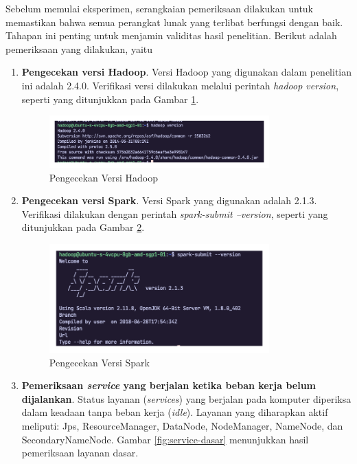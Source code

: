 Sebelum memulai eksperimen, serangkaian pemeriksaan dilakukan untuk memastikan bahwa semua perangkat lunak yang terlibat berfungsi dengan baik. Tahapan ini penting untuk menjamin validitas hasil penelitian. Berikut adalah pemeriksaan yang dilakukan, yaitu
\begin{enumerate}
	\item \textbf{Pengecekan versi Hadoop}. Versi Hadoop yang digunakan dalam penelitian ini adalah 2.4.0. Verifikasi versi dilakukan melalui perintah \textit{hadoop version}, seperti yang ditunjukkan pada Gambar \ref{fig:versi-hadoop}. 
		\begin{figure}[h]
		    \centering
		    \includegraphics[width=0.8\textwidth]{figures/ch04/versi-hadoop}
		    \caption{Pengecekan Versi Hadoop}
		    \label{fig:versi-hadoop}
		\end{figure}
	\item \textbf{Pengecekan versi Spark}. Versi Spark yang digunakan adalah 2.1.3. Verifikasi dilakukan dengan perintah \textit{spark-submit --version}, seperti yang ditunjukkan pada Gambar \ref{fig:versi-spark}.
		\begin{figure}[h]
		    \centering
		    \includegraphics[width=0.8\textwidth]{figures/ch04/versi-spark}
		    \caption{Pengecekan Versi Spark}
		    \label{fig:versi-spark}
		\end{figure}
	\item \textbf{Pemeriksaan \textit{service} yang berjalan ketika beban kerja belum dijalankan}. Status layanan (\textit{services}) yang berjalan pada komputer diperiksa dalam keadaan tanpa beban kerja (\textit{idle}). Layanan yang diharapkan aktif meliputi: Jps, ResourceManager, DataNode, NodeManager, NameNode, dan SecondaryNameNode. Gambar \ref{fig:service-dasar} menunjukkan hasil pemeriksaan layanan dasar.		

\end{enumerate}
